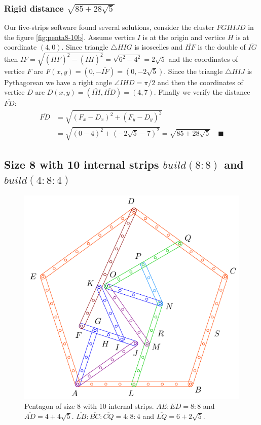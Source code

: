 \documentclass[11pt]{article}
\begin{document}
\subsubsection{Rigid distance $\sqrt{85 + 28\sqrt5}$}

Our five-strips software found several solutions, consider the cluster $FGHIJD$ in the figure \ref{fig:penta8-10b}. Assume vertice $I$ is at the origin and vertice $H$ is at coordinate $(4,0)$. Since triangle $\triangle{HIG}$ is isoscelles and $\overline{HF}$ is the double of $\overline{IG}$ then $\overline{IF} = \sqrt{(\overline{HF})^2 - (\overline{IH})^2} = \sqrt{6^2 - 4^2} = 2\sqrt{5}$ and the coordinates of vertice $F$ are $F(x,y) = (0,-\overline{IF}) = (0,-2\sqrt5)$. Since the triangle $\triangle{HIJ}$ is Pythagorean we have a right angle $\angle{IHD} = \pi / 2$ and then the coordinates of vertice $D$ are $D(x,y) = (\overline{IH},\overline{HD}) = (4,7)$. Finally we verify the distance $\overline{FD}$:
\begin{align}
\overline{FD} &= \sqrt{(F_x - D_x)^2 + (F_y - D_y)^2 } \nonumber\\
 &= \sqrt{(0 - 4)^2 + (-2\sqrt5 - 7)^2} = \sqrt{85 + 28\sqrt5} \quad \blacksquare
\end{align}

\subsection{Size 8 with 10 internal strips $build(8:8)$ and $build(4:8:4)$}

\begin{figure}[h]
\centering
\includegraphics[scale=1]{8/penta8-10c}
\caption{Pentagon of size 8 with 10 internal strips. $\overline{AE}:\overline{ED} = 8:8$ and $\overline{AD} = 4 + 4\sqrt5$. $\overline{LB}:\overline{BC}:\overline{CQ} = 4:8:4$ and $\overline{LQ} = 6 + 2\sqrt5$.}
\label{fig:penta8-10c}
\end{figure}
\end{document}
